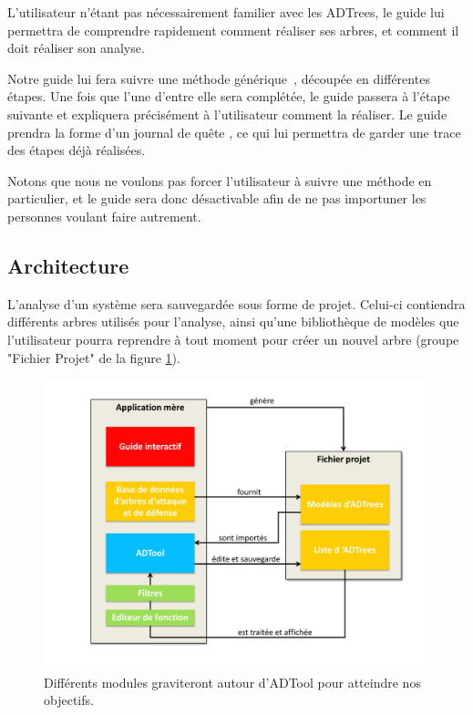         L'utilisateur n'étant pas nécessairement familier avec les ADTrees, le guide lui permettra de comprendre rapidement comment réaliser ses arbres, et comment il doit réaliser son analyse.

        Notre guide lui fera suivre une méthode générique~\cite{methode_analyse}, découpée en différentes étapes. Une fois que l'une d'entre elle sera complétée, le guide passera à l'étape suivante et expliquera précisément à l'utilisateur comment la réaliser.
        Le guide prendra la forme d'un \og journal de quête \fg, ce qui lui permettra de garder une trace des étapes déjà réalisées.
        
        Notons que nous ne voulons pas forcer l'utilisateur à suivre une méthode en particulier, et le guide sera donc désactivable afin de ne pas importuner les personnes voulant faire autrement.

    \subsection{Architecture}
        \label{sec:archi}

        L'analyse d'un système sera sauvegardée sous forme de projet. Celui-ci contiendra différents arbres utilisés pour l'analyse, ainsi qu'une bibliothèque de modèles que l'utilisateur pourra reprendre à tout moment pour créer un nouvel arbre (groupe "Fichier Projet" de la figure \ref{fig:archi}). 

        \begin{figure}
            \begin{center}
                \includegraphics[width=1\textwidth]{figure/archi.pdf}
            \end{center}
            \caption{Différents modules graviteront autour d'ADTool pour atteindre nos objectifs.}
            \label{fig:archi}
        \end{figure}

